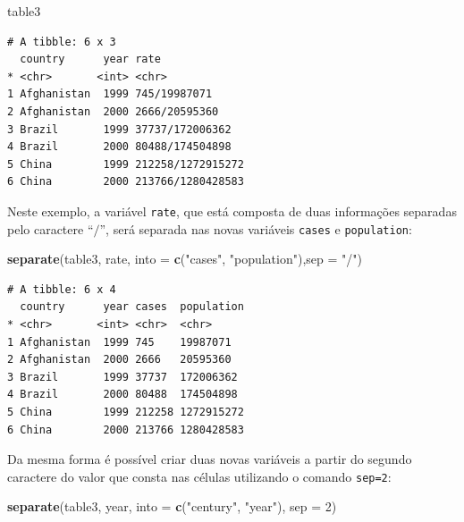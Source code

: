 \documentclass[12pt,brazil,oneside]{book}
\newenvironment{Shaded}{\begin{snugshade}}{\end{snugshade}}
\newcommand{\DataTypeTok}[1]{\textcolor[rgb]{0.13,0.29,0.53}{#1}}
\newcommand{\DecValTok}[1]{\textcolor[rgb]{0.00,0.00,0.81}{#1}}
\newcommand{\KeywordTok}[1]{\textcolor[rgb]{0.13,0.29,0.53}{\textbf{#1}}}
\newcommand{\NormalTok}[1]{#1}
\newcommand{\StringTok}[1]{\textcolor[rgb]{0.31,0.60,0.02}{#1}}
\begin{document}
\begin{Shaded}
\begin{Highlighting}[]
\NormalTok{table3}
\end{Highlighting}
\end{Shaded}

\begin{verbatim}
# A tibble: 6 x 3
  country      year rate             
* <chr>       <int> <chr>            
1 Afghanistan  1999 745/19987071     
2 Afghanistan  2000 2666/20595360    
3 Brazil       1999 37737/172006362  
4 Brazil       2000 80488/174504898  
5 China        1999 212258/1272915272
6 China        2000 213766/1280428583
\end{verbatim}

Neste exemplo, a variável \texttt{rate}, que está composta de duas informações separadas pelo caractere ``\(/\)'', será separada nas novas variáveis \texttt{cases} e \texttt{population}:

\begin{Shaded}
\begin{Highlighting}[]
\KeywordTok{separate}\NormalTok{(table3, rate, }\DataTypeTok{into =} \KeywordTok{c}\NormalTok{(}\StringTok{"cases"}\NormalTok{, }\StringTok{"population"}\NormalTok{),}\DataTypeTok{sep =} \StringTok{"/"}\NormalTok{)}
\end{Highlighting}
\end{Shaded}

\begin{verbatim}
# A tibble: 6 x 4
  country      year cases  population
* <chr>       <int> <chr>  <chr>     
1 Afghanistan  1999 745    19987071  
2 Afghanistan  2000 2666   20595360  
3 Brazil       1999 37737  172006362 
4 Brazil       2000 80488  174504898 
5 China        1999 212258 1272915272
6 China        2000 213766 1280428583
\end{verbatim}

Da mesma forma é possível criar duas novas variáveis a partir do segundo caractere do valor que consta nas células utilizando o comando \texttt{sep=2}:

\begin{Shaded}
\begin{Highlighting}[]
\KeywordTok{separate}\NormalTok{(table3, year, }\DataTypeTok{into =} \KeywordTok{c}\NormalTok{(}\StringTok{"century"}\NormalTok{, }\StringTok{"year"}\NormalTok{), }\DataTypeTok{sep =} \DecValTok{2}\NormalTok{)}
\end{Highlighting}
\end{Shaded}
\end{document}
